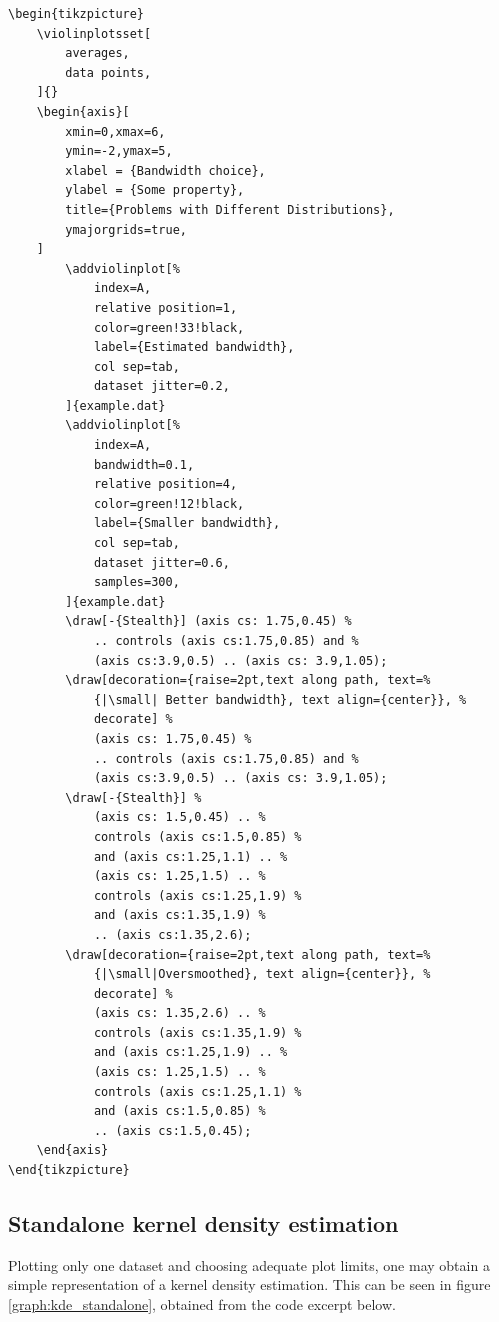 \documentclass{article}
\begin{document}
\begin{verbatim}
\begin{tikzpicture}
	\violinplotsset[
		averages,
		data points,
	]{}
	\begin{axis}[
		xmin=0,xmax=6,
		ymin=-2,ymax=5,
		xlabel = {Bandwidth choice},
		ylabel = {Some property},
		title={Problems with Different Distributions},
		ymajorgrids=true,
	]
		\addviolinplot[%
			index=A,
			relative position=1,
			color=green!33!black,
			label={Estimated bandwidth},
			col sep=tab,
			dataset jitter=0.2,
		]{example.dat}
		\addviolinplot[%
			index=A,
			bandwidth=0.1,
			relative position=4,
			color=green!12!black,
			label={Smaller bandwidth},
			col sep=tab,
			dataset jitter=0.6,
			samples=300,
		]{example.dat}
		\draw[-{Stealth}] (axis cs: 1.75,0.45) %
			.. controls (axis cs:1.75,0.85) and %
			(axis cs:3.9,0.5) .. (axis cs: 3.9,1.05);
		\draw[decoration={raise=2pt,text along path, text=%
			{|\small| Better bandwidth}, text align={center}}, %
			decorate] %
			(axis cs: 1.75,0.45) %
			.. controls (axis cs:1.75,0.85) and %
			(axis cs:3.9,0.5) .. (axis cs: 3.9,1.05);
		\draw[-{Stealth}] %
			(axis cs: 1.5,0.45) .. %
			controls (axis cs:1.5,0.85) %
			and (axis cs:1.25,1.1) .. %
			(axis cs: 1.25,1.5) .. %
			controls (axis cs:1.25,1.9) %
			and (axis cs:1.35,1.9) %
			.. (axis cs:1.35,2.6);
		\draw[decoration={raise=2pt,text along path, text=%
			{|\small|Oversmoothed}, text align={center}}, %
			decorate] %
			(axis cs: 1.35,2.6) .. %
			controls (axis cs:1.35,1.9) %
			and (axis cs:1.25,1.9) .. %
			(axis cs: 1.25,1.5) .. %
			controls (axis cs:1.25,1.1) %
			and (axis cs:1.5,0.85) %
			.. (axis cs:1.5,0.45);
	\end{axis}
\end{tikzpicture}
\end{verbatim}

\subsection{Standalone kernel density estimation}

Plotting only one dataset and choosing adequate plot limits, one
may obtain a simple representation of a kernel density estimation.
This can be seen in figure \ref{graph:kde_standalone}, obtained from the
code excerpt below.
\end{document}
